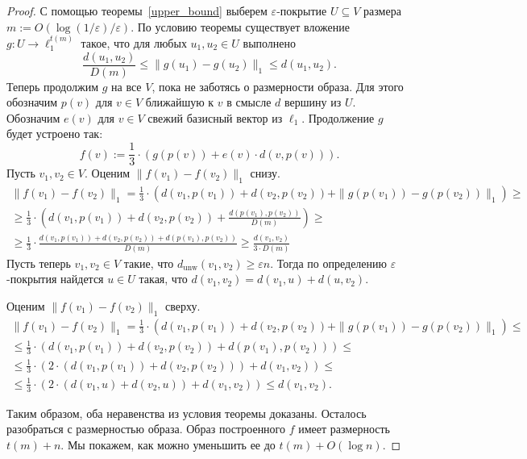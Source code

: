 \documentclass[12pt]{article}
\newcommand{\eps}{\varepsilon}
\newcommand{\dunw}{d_{\mathrm{unw}}}
\begin{document}
    \begin{proof}
        С помощью теоремы~\ref{upper_bound} выберем $\eps$-покрытие $U \subseteq V$ размера
        $m := O(\log(1 / \eps) / \eps)$.
        По условию теоремы существует вложение $g \colon U \to \ell_1^{t(m)}$ такое, что для любых $u_1, u_2 \in U$
        выполнено
        $$
            \frac{d(u_1, u_2)}{D(m)} \leq \|g(u_1) - g(u_2)\|_1 \leq d(u_1, u_2).
        $$
        Теперь продолжим $g$ на все $V$, пока не заботясь о размерности образа.
        Для этого обозначим $p(v)$ для $v \in V$ ближайшую к $v$ в смысле $d$ вершину из $U$.
        Обозначим $e(v)$ для $v \in V$ свежий базисный вектор из $\ell_1$.
        Продолжение $g$ будет устроено так:
        $$
            f(v) := \frac{1}{3} \cdot (g(p(v)) + e(v) \cdot d(v, p(v))).
        $$
        Пусть $v_1, v_2 \in V$. Оценим $\|f(v_1) - f(v_2)\|_1$ снизу.
        \begin{eqnarray*}
            \|f(v_1) - f(v_2)\|_1 = \frac{1}{3} \cdot (d(v_1, p(v_1)) + d(v_2, p(v_2)) + \|g(p(v_1)) - g(p(v_2))\|_1)
            \geq\\\geq \frac{1}{3} \cdot \left(d(v_1, p(v_1)) + d(v_2, p(v_2)) + \frac{d(p(v_1), p(v_2))}{D(m)}\right)
            \geq\\\geq \frac{1}{3} \cdot \frac{d(v_1, p(v_1)) + d(v_2, p(v_2)) + d(p(v_1), p(v_2))}{D(m)}
            \geq \frac{d(v_1, v_2)}{3 \cdot D(m)}
        \end{eqnarray*}
        Пусть теперь $v_1, v_2 \in V$ такие, что $\dunw(v_1, v_2) \geq \eps n$.
        Тогда по определению $\eps$-покрытия найдется $u \in U$ такая, что $d(v_1, v_2) = d(v_1, u) + d(u, v_2)$.

        Оценим $\|f(v_1) - f(v_2)\|_1$ сверху.
        \begin{eqnarray*}
            \|f(v_1) - f(v_2)\|_1 = \frac{1}{3} \cdot (d(v_1, p(v_1)) + d(v_2, p(v_2)) + \|g(p(v_1)) - g(p(v_2))\|_1)
            \leq\\\leq \frac{1}{3} \cdot (d(v_1, p(v_1)) + d(v_2, p(v_2)) + d(p(v_1), p(v_2)))
            \leq\\\leq \frac{1}{3} \cdot (2 \cdot(d(v_1, p(v_1)) + d(v_2, p(v_2))) + d(v_1, v_2))
            \leq\\\leq \frac{1}{3} \cdot (2 \cdot(d(v_1, u) + d(v_2, u)) + d(v_1, v_2)) \leq d(v_1, v_2).
        \end{eqnarray*}

        Таким образом, оба неравенства из условия теоремы доказаны. Осталось разобраться с размерностью образа.
        Образ построенного $f$ имеет размерность $t(m) + n$.
        Мы покажем, как можно уменьшить ее до $t(m) + O(\log n)$.


\end{proof}
\end{document}
